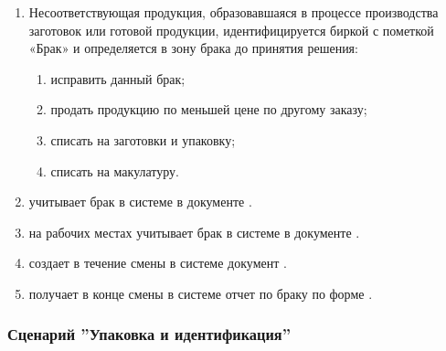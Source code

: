 \begin{enumerate}
\item	Несоответствующая продукция, образовавшаяся в процессе производства заготовок или готовой продукции, идентифицируется биркой с пометкой «Брак» и определяется в зону брака до принятия решения:

\begin{enumerate}
    \item исправить данный брак;
    \item продать продукцию по меньшей цене по другому заказу;
    \item списать на заготовки и упаковку;
    \item списать на макулатуру.
\end{enumerate}
\item	\gaoperator учитывает брак в системе \gofro в документе .
\item	\operator на  рабочих местах учитывает брак в системе \gofro в документе .
\item	\master  создает в течение смены в системе \gofro документ .
\item	\master  получает в конце смены в системе \gofro отчет по браку по форме .



\end{enumerate}



\subsubsection{Сценарий ''Упаковка и идентификация''}
\label{bp:production_40}

